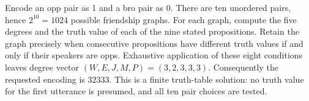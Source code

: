 Encode an opp pair as 1 and a bro pair as 0. There are ten unordered pairs, hence $2^{10}=1024$ possible friendship graphs. For each graph, compute the five degrees and the truth value of each of the nine stated propositions. Retain the graph precisely when consecutive propositions have different truth values if and only if their speakers are opps. Exhaustive application of these eight conditions leaves degree vector $(W,E,J,M,P)=(3,2,3,3,3)$. Consequently the requested encoding is $\boxed{32333}$. This is a finite truth-table solution: no truth value for the first utterance is presumed, and all ten pair choices are tested.
